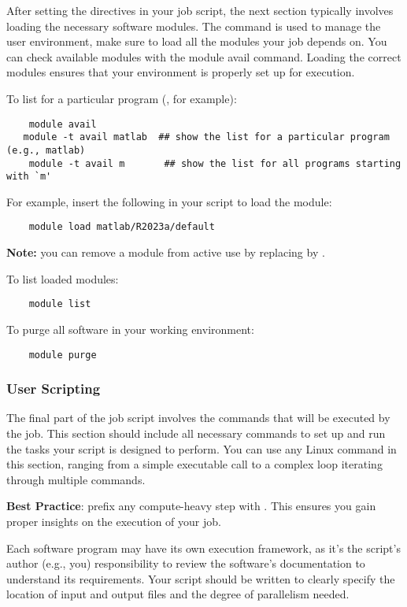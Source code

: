 After setting the directives in your job script, the next section typically involves loading
the necessary software modules. The  command is used to manage the user environment,
make sure to load all the modules your job depends on. You can check available modules with the
module avail command. Loading the correct modules ensures that your environment is properly
set up for execution.

\noindent To list for a particular program (, for example):
\small
\begin{verbatim}
    module avail
   module -t avail matlab  ## show the list for a particular program (e.g., matlab)
    module -t avail m       ## show the list for all programs starting with `m'
\end{verbatim}
\normalsize

For example, insert the following in your script to load the  module:
\begin{verbatim}
    module load matlab/R2023a/default
\end{verbatim}

\textbf{Note:} you can remove a module from active use by replacing  by .

To list loaded modules:
\begin{verbatim}
    module list
\end{verbatim}

To purge all software in your working environment:
\begin{verbatim}
    module purge
\end{verbatim}

\subsubsection{User Scripting}
\label{sect:scripting}

The final part of the job script involves the commands that will be executed by the job.
This section should include all necessary commands to set up and run the tasks
your script is designed to perform. You can use any Linux command in this section,
ranging from a simple executable call to a complex loop iterating through multiple commands.

\noindent \textbf{Best Practice}: prefix any compute-heavy step with .
This ensures you gain proper insights on the execution of your job.

\noindent Each software program may have its own execution framework, as it's the script's author (e.g., you)
responsibility to review the software's documentation to understand its requirements.
Your script should be written to clearly specify the location of input and output files and the degree of parallelism needed.

